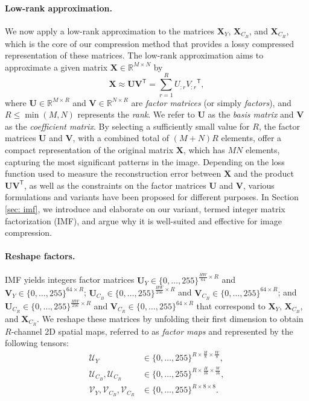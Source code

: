 \paragraph{Low-rank approximation.} 
We now apply a low-rank approximation to the matrices $\bm{X}_{Y}$, $\bm{X}_{C_B}$, and $\bm{X}_{C_R}$, which is the core of our compression method that provides a lossy compressed representation of these matrices.  The low-rank approximation \citep{eckart1936approximation} aims to approximate a given matrix $ \bm{X} \in \mathbb{R}^{M \times N} $ by 
\begin{equation} \label{eq: lra}
	\bm{X} \approx \bm{U} \bm{V}^\mathsf{T} = \sum_{r=1}^{R} U_{:r} {V_{:r}}^\mathsf{T},
\end{equation} 
where $\bm{U} \in \mathbb{R}^{M \times R}$ and $\bm{V} \in \mathbb{R}^{N \times R}$ are \emph{factor matrices} (or simply \emph{factors}), and $R \leq \min(M,N)$ represents the \emph{rank}. We refer to $\bm{U}$ as the \emph{basis matrix} and $\bm{V}$ as the \emph{coefficient matrix}. By selecting a sufficiently small value for $R$, the factor matrices $\bm{U}$ and $\bm{V}$, with a combined total of $(M+N)R$ elements, offer a compact representation of the original matrix $\bm{X}$, which has $MN$ elements, capturing the most significant patterns in the image. Depending on the loss function used to measure the reconstruction error between $\bm{X}$ and the product $\bm{U} \bm{V}^\mathsf{T}$, as well as the constraints on the factor matrices $\bm{U}$ and $\bm{V}$, various formulations and variants have been proposed for different purposes. In Section \ref{sec: imf}, we introduce and elaborate on our variant, termed integer matrix factorization (IMF), and argue why it is well-suited and effective for image compression. 

\paragraph{Reshape factors.} 
IMF yields integers factor matrices $\bm{U}_{Y} \in \{0, \ldots, 255\}^{\frac{HW}{64} \times R}$ and $\bm{V}_{Y} \in \{0, \ldots, 255\}^{64 \times R}$; $\bm{U}_{C_B} \in \{0, \ldots, 255\}^{\frac{HW}{256} \times R}$ and $\bm{V}_{C_B} \in \{0, \ldots, 255\}^{64 \times R}$; and $\bm{U}_{C_R} \in \{0, \ldots, 255\}^{\frac{HW}{256} \times R}$ and $\bm{V}_{C_R} \in \{0, \ldots, 255\}^{64 \times R}$ that correspond to $\bm{X}_{Y}$, $\bm{X}_{C_B}$, and $\bm{X}_{C_R}$. We reshape these matrices by unfolding their first dimension to obtain $R$-channel 2D spatial maps, referred to as \emph{factor maps} and represented by the following tensors:
\begin{align} \label{eq: reshaped factors}
	\bm{\mathcal{U}}_{Y} & \in \{0, \ldots, 255\}^{R \times \frac{H}{8} \times \frac{W}{8}}, \nonumber \\
	\bm{\mathcal{U}}_{C_B}, \bm{\mathcal{U}}_{C_R} & \in \{0, \ldots, 255\}^{R \times \frac{H}{16} \times \frac{W}{16}}, \nonumber \\
	\bm{\mathcal{V}}_{Y}, \bm{\mathcal{V}}_{C_B}, \bm{\mathcal{V}}_{C_R} & \in \{0, \ldots, 255\}^{R \times 8 \times 8}.
\end{align}

